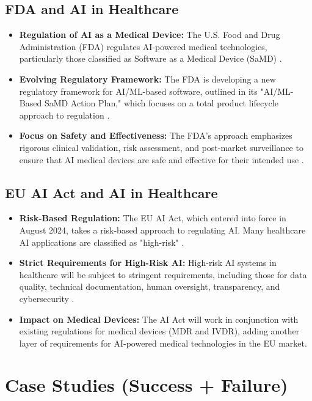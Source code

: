 \subsection{FDA and AI in Healthcare}
\begin{itemize}
    \item \textbf{Regulation of AI as a Medical Device:} The U.S. Food and Drug Administration (FDA) regulates AI-powered medical technologies, particularly those classified as Software as a Medical Device (SaMD) \cite{FDAGov_FDA}.
    \item \textbf{Evolving Regulatory Framework:} The FDA is developing a new regulatory framework for AI/ML-based software, outlined in its "AI/ML-Based SaMD Action Plan," which focuses on a total product lifecycle approach to regulation \cite{GraylightImaging_FDA}.
    \item \textbf{Focus on Safety and Effectiveness:} The FDA's approach emphasizes rigorous clinical validation, risk assessment, and post-market surveillance to ensure that AI medical devices are safe and effective for their intended use \cite{MPO_FDA}.
\end{itemize}

\subsection{EU AI Act and AI in Healthcare}
\begin{itemize}
    \item \textbf{Risk-Based Regulation:} The EU AI Act, which entered into force in August 2024, takes a risk-based approach to regulating AI. Many healthcare AI applications are classified as "high-risk" \cite{AccessPartnership_EUAIAct}.
    \item \textbf{Strict Requirements for High-Risk AI:} High-risk AI systems in healthcare will be subject to stringent requirements, including those for data quality, technical documentation, human oversight, transparency, and cybersecurity \cite{WNS_EUAIAct}.
    \item \textbf{Impact on Medical Devices:} The AI Act will work in conjunction with existing regulations for medical devices (MDR and IVDR), adding another layer of requirements for AI-powered medical technologies in the EU market.
\end{itemize}

\section{Case Studies (Success + Failure)}

